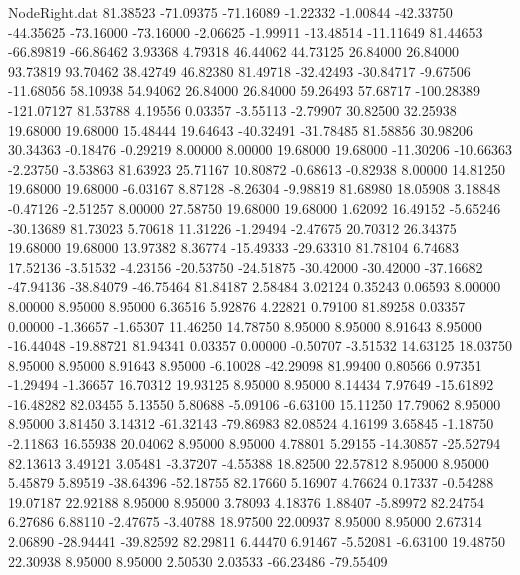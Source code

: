 \begin{filecontents}{NodeRight.dat}
  81.38523  -71.09375  -71.16089    -1.22332   -1.00844  -42.33750  -44.35625  -73.16000  -73.16000   -2.06625   -1.99911  -13.48514  -11.11649
  81.44653  -66.89819  -66.86462     3.93368    4.79318   46.44062   44.73125   26.84000   26.84000   93.73819   93.70462   38.42749   46.82380
  81.49718  -32.42493  -30.84717    -9.67506  -11.68056   58.10938   54.94062   26.84000   26.84000   59.26493   57.68717 -100.28389 -121.07127
  81.53788    4.19556    0.03357    -3.55113   -2.79907   30.82500   32.25938   19.68000   19.68000   15.48444   19.64643  -40.32491  -31.78485
  81.58856   30.98206   30.34363    -0.18476   -0.29219    8.00000    8.00000   19.68000   19.68000  -11.30206  -10.66363   -2.23750   -3.53863
  81.63923   25.71167   10.80872    -0.68613   -0.82938    8.00000   14.81250   19.68000   19.68000   -6.03167    8.87128   -8.26304   -9.98819
  81.68980   18.05908    3.18848    -0.47126   -2.51257    8.00000   27.58750   19.68000   19.68000    1.62092   16.49152   -5.65246  -30.13689
  81.73023    5.70618   11.31226    -1.29494   -2.47675   20.70312   26.34375   19.68000   19.68000   13.97382    8.36774  -15.49333  -29.63310
  81.78104    6.74683   17.52136    -3.51532   -4.23156  -20.53750  -24.51875  -30.42000  -30.42000  -37.16682  -47.94136  -38.84079  -46.75464
  81.84187    2.58484    3.02124     0.35243    0.06593    8.00000    8.00000    8.95000    8.95000    6.36516    5.92876    4.22821    0.79100
  81.89258    0.03357    0.00000    -1.36657   -1.65307   11.46250   14.78750    8.95000    8.95000    8.91643    8.95000  -16.44048  -19.88721
  81.94341    0.03357    0.00000    -0.50707   -3.51532   14.63125   18.03750    8.95000    8.95000    8.91643    8.95000   -6.10028  -42.29098
  81.99400    0.80566    0.97351    -1.29494   -1.36657   16.70312   19.93125    8.95000    8.95000    8.14434    7.97649  -15.61892  -16.48282
  82.03455    5.13550    5.80688    -5.09106   -6.63100   15.11250   17.79062    8.95000    8.95000    3.81450    3.14312  -61.32143  -79.86983
  82.08524    4.16199    3.65845    -1.18750   -2.11863   16.55938   20.04062    8.95000    8.95000    4.78801    5.29155  -14.30857  -25.52794
  82.13613    3.49121    3.05481    -3.37207   -4.55388   18.82500   22.57812    8.95000    8.95000    5.45879    5.89519  -38.64396  -52.18755
  82.17660    5.16907    4.76624     0.17337   -0.54288   19.07187   22.92188    8.95000    8.95000    3.78093    4.18376    1.88407   -5.89972
  82.24754    6.27686    6.88110    -2.47675   -3.40788   18.97500   22.00937    8.95000    8.95000    2.67314    2.06890  -28.94441  -39.82592
  82.29811    6.44470    6.91467    -5.52081   -6.63100   19.48750   22.30938    8.95000    8.95000    2.50530    2.03533  -66.23486  -79.55409

\end{filecontents}
